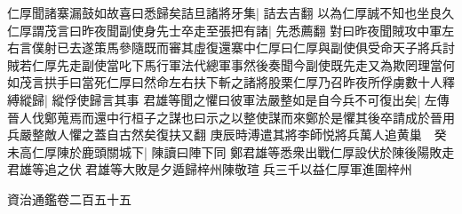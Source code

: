 仁厚聞諸寨漏鼓如故喜曰悉歸矣詰旦諸將牙集|{
	詰去吉翻}
以為仁厚誠不知也坐良久仁厚謂茂言曰昨夜聞副使身先士卒走至張把有諸|{
	先悉薦翻}
對曰昨夜聞賊攻中軍左右言僕射已去遂策馬參隨既而審其虛復還寨中仁厚曰仁厚與副使俱受命天子將兵討賊若仁厚先走副使當叱下馬行軍法代總軍事然後奏聞今副使既先走又為欺罔理當何如茂言拱手曰當死仁厚曰然命左右扶下斬之諸將股栗仁厚乃召昨夜所俘虜數十人釋縛縱歸|{
	縱俘使歸言其事}
君雄等聞之懼曰彼軍法嚴整如是自今兵不可復出矣|{
	左傳晉人伐鄭蒐焉而還中行桓子之謀也曰示之以整使謀而來鄭於是懼其後卒請成於晉用兵嚴整敵人懼之蓋自古然矣復扶又翻}
庚辰時溥遣其將李師悦將兵萬人追黄巢　癸未高仁厚陳於鹿頭關城下|{
	陳讀曰陣下同}
鄭君雄等悉衆出戰仁厚設伏於陳後陽敗走君雄等追之伏君雄等大敗是夕遁歸梓州陳敬瑄兵三千以益仁厚軍進圍梓州

資治通鑑卷二百五十五





















































































